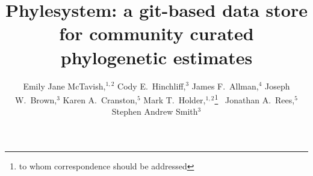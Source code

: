 \documentclass{bioinfo}
\begin{document}
\title[phylesystem git phylostore]{Phylesystem: a git-based data store for community curated phylogenetic estimates}

\author[McTavish\textit{et~al}]{
    Emily Jane McTavish,$^{1,2}$
    Cody E.~Hinchliff,${^3}$
    James F.~Allman,${^4}$
    Joseph W.~Brown,${^3}$
    Karen A.~Cranston,${^5}$
    Mark T.~Holder,$^{1,2}$\footnote{to whom correspondence should be addressed}~
    Jonathan A.~Rees,${^5}$
    Stephen Andrew Smith${^3}$
}
\address{$^{1}$Department of Ecology and Evolutionary Biology, University of Kansas, Lawrence KS, USA\\
$^{2}$Heidelberg Institute of Theoretical Studies, Heidelberg, Germany \\
$^{3}$Department of Ecology and Evolutionary Biology, University of Michigan, Ann Arbor, Michigan, USA\\
$^{4}$Interrobang Corporation, Wake Forest, North Carolina, USA\\
$^{5}$National Evolutionary Synthesis Center, Duke University, Durham, North Carolina, USA}


\maketitle
\end{document}
